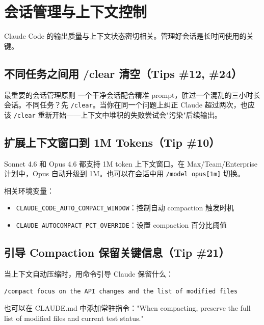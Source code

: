 \documentclass[a4paper]{article}
\begin{document}
\section{会话管理与上下文控制}

Claude Code 的输出质量与上下文状态密切相关。管理好会话是长时间使用的关键。

\subsection{不同任务之间用 /clear 清空（Tips \#12, \#24）}

\begin{importantbox}{最重要的会话管理原则}
一个干净会话配合精准 prompt，胜过一个混乱的三小时长会话。不同任务？先 \texttt{/clear}。当你在同一个问题上纠正 Claude 超过两次，也应该 \texttt{/clear} 重新开始——上下文中堆积的失败尝试会"污染"后续输出。
\end{importantbox}

\subsection{扩展上下文窗口到 1M Tokens（Tip \#10）}

Sonnet 4.6 和 Opus 4.6 都支持 1M token 上下文窗口。在 Max/Team/Enterprise 计划中，Opus 自动升级到 1M。也可以在会话中用 \texttt{/model opus[1m]} 切换。

相关环境变量：
\begin{itemize}
  \item \texttt{CLAUDE\_CODE\_AUTO\_COMPACT\_WINDOW}：控制自动 compaction 触发时机
  \item \texttt{CLAUDE\_AUTOCOMPACT\_PCT\_OVERRIDE}：设置 compaction 百分比阈值
\end{itemize}

\subsection{引导 Compaction 保留关键信息（Tip \#21）}

当上下文自动压缩时，用命令引导 Claude 保留什么：

\begin{lstlisting}[caption={引导 compaction 示例}, language=bash]
/compact focus on the API changes and the list of modified files
\end{lstlisting}

也可以在 CLAUDE.md 中添加常驻指令："When compacting, preserve the full list of modified files and current test status."
\end{document}
